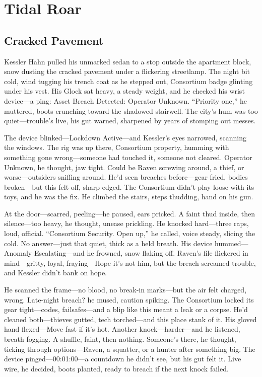 \documentclass[12pt]{book}
\begin{document}
\chapter{Tidal Roar}

\section{Cracked Pavement}

Kessler Hahn pulled his unmarked sedan to a stop outside the apartment block, snow dusting the cracked pavement under a flickering streetlamp. The night bit cold, wind tugging his trench coat as he stepped out, Consortium badge glinting under his vest. His Glock sat heavy, a steady weight, and he checked his wrist device—a ping: Asset Breach Detected: Operator Unknown. “Priority one,” he muttered, boots crunching toward the shadowed stairwell. The city’s hum was too quiet—trouble’s live, his gut warned, sharpened by years of stomping out messes.

The device blinked—Lockdown Active—and Kessler’s eyes narrowed, scanning the windows. The rig was up there, Consortium property, humming with something gone wrong—someone had touched it, someone not cleared. Operator Unknown, he thought, jaw tight. Could be Raven screwing around, a thief, or worse—outsiders sniffing around. He’d seen breaches before—gear fried, bodies broken—but this felt off, sharp-edged. The Consortium didn’t play loose with its toys, and he was the fix. He climbed the stairs, steps thudding, hand on his gun.

At the door—scarred, peeling—he paused, ears pricked. A faint thud inside, then silence—too heavy, he thought, unease prickling. He knocked hard—three raps, loud, official. “Consortium Security. Open up,” he called, voice steady, slicing the cold. No answer—just that quiet, thick as a held breath. His device hummed—Anomaly Escalating—and he frowned, snow flaking off. Raven’s file flickered in mind—gritty, loyal, fraying—Hope it’s not him, but the breach screamed trouble, and Kessler didn’t bank on hope.

He scanned the frame—no blood, no break-in marks—but the air felt charged, wrong. Late-night breach? he mused, caution spiking. The Consortium locked its gear tight—codes, failsafes—and a blip like this meant a leak or a corpse. He’d cleaned both—thieves gutted, tech torched—and this place stank of it. His gloved hand flexed—Move fast if it’s hot. Another knock—harder—and he listened, breath fogging. A shuffle, faint, then nothing. Someone’s there, he thought, ticking through options—Raven, a squatter, or a hunter after something big. The device pinged—00:01:00—a countdown he didn’t see, but his gut felt it. Live wire, he decided, boots planted, ready to breach if the next knock failed.
\end{document}
